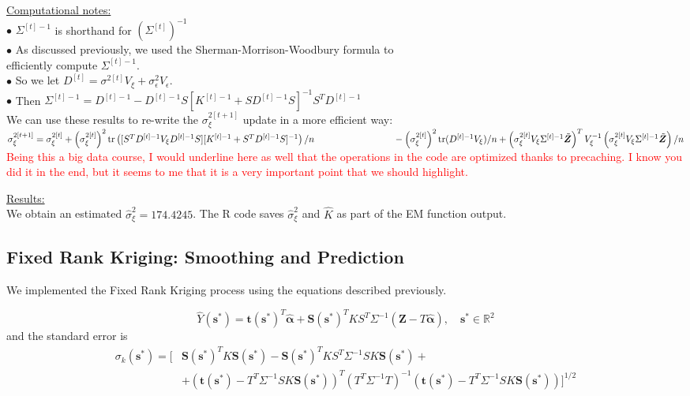 \documentclass[11pt]{article}
\newcommand{\myindent}{\hspace*{1cm}}
\begin{document}
\underline{Computational notes:} \\
\myindent $\bullet$ $\Sigma^{[t]-1}$ is shorthand for $(\Sigma^{[t]})^{-1}$ \\
\myindent $\bullet$ As discussed previously, we used the Sherman-Morrison-Woodbury formula to  \\ \myindent \myindent efficiently compute $\Sigma^{[t]-1}$.\\
\myindent $\bullet$ So we let $D^{[t]} = \sigma^{2[t]}V_\xi + \sigma^2_\epsilon V_\epsilon$. \\
\myindent $\bullet$ Then $\Sigma^{[t]-1} = D^{[t]-1} -  D^{[t]-1}S[K^{[t]-1} + SD^{[t]-1}S]^{-1}S^TD^{[t]-1}$\\

We can use these results to re-write the $\sigma_\xi^{2[t+1]}$ update in a more efficient way: \\

\myindent \myindent $\sigma_\xi^{2[t+1]} = \sigma_\xi^{2[t]} 
+ \left( \sigma_\xi^{2[t]} \right)^2 \text{tr} \left([S^TD^{[t]-1}V_\xi D^{[t]-1}S][K^{[t]-1} + S^TD^{[t]-1}S]^{-1} \right)/n \\ \myindent \myindent \myindent
- \left( \sigma_\xi^{2[t]} \right)^2 \text{tr}(D^{[t]-1}V_\xi)/n
+ \left(\sigma_\xi^{2[t]}V_\xi \Sigma^{[t]-1} \tilde{\bm{Z}}\right)^T
V_\xi^{-1}
\left(\sigma_\xi^{2[t]}V_\xi \Sigma^{[t]-1} \tilde{\bm{Z}}\right)/n$\\

\textcolor{red}{Being this a big data course, I would underline here as well that the operations in the code are optimized thanks to precaching. I know you did it in the end, but it seems to me that it is a very important point that we should highlight.}

\underline{Results:}\\
We obtain an estimated $\hat{\sigma}^2_{\xi} = 174.4245$.  The R code saves $\hat{\sigma}^2_{\xi}$ and $\hat{K}$ as part of the EM function output.\\

\subsection{Fixed Rank Kriging: Smoothing and Prediction}

We implemented the Fixed Rank Kriging process using the equations described previously.

\begin{equation}
\hat{Y}(\bm{s}^*) = \bm{t}(\bm{s}^*)^T \hat{\bm{\alpha}} + \bm{S}(\bm{s}^*)^T K S^T \Sigma^{-1} (\bm{Z} - T \hat{\bm{\alpha}}), \quad \bm{s}^* \in \mathbb{R}^2
\end{equation}
and the standard error is
\begin{equation}
\begin{split}
\sigma_k(\bm{s}^*) = \big[ &\bm{S}(\bm{s}^*)^T K \bm{S}(\bm{s}^*) - \bm{S}(\bm{s}^*)^T K S^T \Sigma^{-1} S K \bm{S}(\bm{s}^*) + 
\\
&+ (\bm{t}(\bm{s}^*) - T^T \Sigma^{-1} S K \bm{S}(\bm{s}^*))^T (T^T \Sigma^{-1} T)^{-1} (\bm{t}(\bm{s}^*) - T^T \Sigma^{-1} S K \bm{S}(\bm{s}^*)) \big]^{1/2}
\end{split}
\end{equation}
\end{document}
